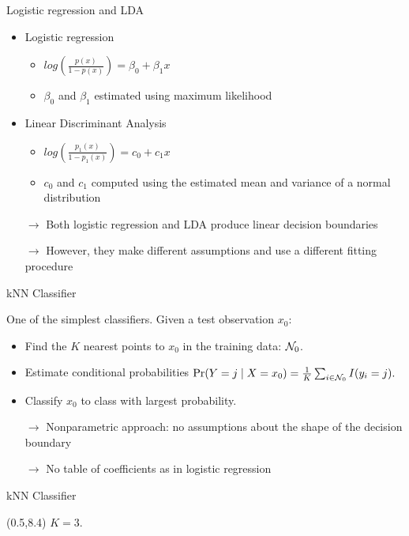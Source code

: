 \documentclass[14pt]{beamer}
\begin{document}
\begin{frame}{Logistic regression and LDA}

\begin{itemize}
	
	\item Logistic regression
	\begin{itemize}
	\item $log(\frac{p(x)}{1 - p(x)}) = \beta_0 + \beta_1 x$
	\item $\beta_0$ and $\beta_1$ estimated using maximum likelihood
	\end{itemize}
	
	\item Linear Discriminant Analysis
	\begin{itemize}
	\item $log(\frac{p_1(x)}{1 - p_1(x)}) = c_0 + c_1 x$
	\item $c_0$ and $c_1$ computed using the estimated mean and variance of a normal distribution
	\end{itemize}
	
	\item[$\rightarrow$] Both logistic regression and LDA produce linear decision boundaries
	\item[$\rightarrow$] However, they make different assumptions and use a different fitting procedure 
	
\end{itemize}
\end{frame}


\begin{frame}{kNN Classifier}

One of the simplest classifiers. Given a test observation $x_0$:
\begin{itemize}
\item Find the $K$ nearest points to $x_0$ in the training data: ${\cal N}_0$.
\item Estimate conditional probabilities
$\text{Pr}(Y=j \mid X=x_0) = \frac{1}{K}\sum_{i\in {\cal N}_0} I(y_i = j).$
\item Classify $x_0$ to class with largest probability.
\item[$\rightarrow$] Nonparametric approach: no assumptions about the shape of the decision boundary
\item[$\rightarrow$] No table of coefficients as in logistic regression
\end{itemize}
\end{frame}

\begin{frame}{kNN Classifier}
\begin{textblock}{10}(0.5,8.4)
$K=3$.
\end{textblock}
\end{frame}
\end{document}
